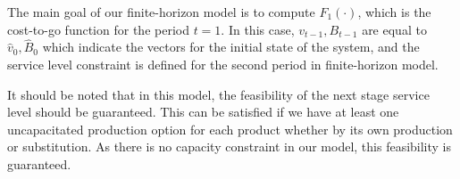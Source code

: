 \documentclass[11pt]{article}
\newcommand{\ti}{t} %
\newcommand{\ka}{k} %
\newcommand{\KA}{\mathcal{K}}
\newcommand{\Ka}{K}
\newcommand{\jey}{j} %
\newcommand{\Graf}{\mathcal{A}} %
\newcommand{\Bi}{B} %
\newcommand{\Vi}{v} %
\newcommand{\Es}{S} %
\newcommand{\x}{x} %
\newcommand{\y}{y} %
\newcommand{\Csub}{\mathcal{K}^+_k}
\newcommand{\Psub}{\mathcal{K}^-_k}
\newcommand{\tAct}{\hat{\ti}} %
\begin{document}
The main goal of our finite-horizon model is to compute $F_{1}(\cdot)$, which is the cost-to-go function for the period $\ti =1$. In this case, $\Vi_{t-1}, \Bi_{t-1}$ are equal to $\hat{\Vi}_{0},\hat{\Bi}_{0}$ which indicate the vectors for the initial state of the system, and the service level constraint is defined for the second period in finite-horizon model.


It should be noted that in this model, the feasibility of the next stage service level should be guaranteed. This can be satisfied if we have at least one uncapacitated production option for each product whether by its own production or substitution. As there is no capacity constraint in our model, this feasibility is guaranteed.
\end{document}
